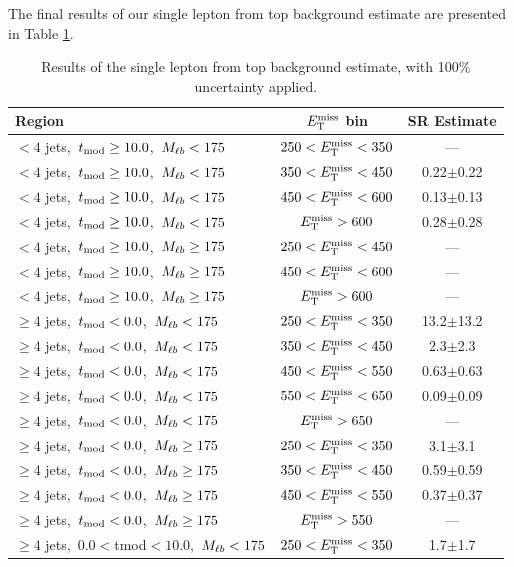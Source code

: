 The final results of our single lepton from top background estimate
are presented in Table \ref{tab:stop:1ltop:results}.

\begin{table}[htbp]
\centering
\caption{Results of the single lepton from top background estimate,
  with 100\% uncertainty applied.}
\label{tab:stop:1ltop:results}
\begin{tabular}{|l|c|c|}
\hline
Region & $E_\text{T}^\text{miss}$ bin & SR Estimate\\
\hline
$<4$ jets,~$t_\text{mod} \ge10.0$,~$M_{\ell b} <175$ & $250<E_\text{T}^\text{miss}<350$ &  ---  \\
$<4$ jets,~$t_\text{mod} \ge10.0$,~$M_{\ell b} <175$ & $350<E_\text{T}^\text{miss}<450$ &  0.22$\pm$0.22 \\
$<4$ jets,~$t_\text{mod} \ge10.0$,~$M_{\ell b} <175$ & $450<E_\text{T}^\text{miss}<600$ &  0.13$\pm$0.13  \\
$<4$ jets,~$t_\text{mod} \ge10.0$,~$M_{\ell b} <175$ & $E_\text{T}^\text{miss}>600$     &  0.28$\pm$0.28 \\
\hline
$<4$ jets,~$t_\text{mod} \ge10.0$,~$M_{\ell b} \ge175$ & $250<E_\text{T}^\text{miss}<450$ &  --- \\
$<4$ jets,~$t_\text{mod} \ge10.0$,~$M_{\ell b} \ge175$ & $450<E_\text{T}^\text{miss}<600$ &  ---  \\
$<4$ jets,~$t_\text{mod} \ge10.0$,~$M_{\ell b} \ge175$ & $E_\text{T}^\text{miss}>600$     &  ---  \\
\hline
$\ge4$ jets,~$t_\text{mod} <0.0$,~$M_{\ell b} <175$ & $250<E_\text{T}^\text{miss}<350$ &  13.2$\pm$13.2  \\
$\ge4$ jets,~$t_\text{mod} <0.0$,~$M_{\ell b} <175$ & $350<E_\text{T}^\text{miss}<450$ &  2.3$\pm$2.3  \\
$\ge4$ jets,~$t_\text{mod} <0.0$,~$M_{\ell b} <175$ & $450<E_\text{T}^\text{miss}<550$ &  0.63$\pm$0.63  \\
$\ge4$ jets,~$t_\text{mod} <0.0$,~$M_{\ell b} <175$ & $550<E_\text{T}^\text{miss}<650$ &  0.09$\pm$0.09 \\
$\ge4$ jets,~$t_\text{mod} <0.0$,~$M_{\ell b} <175$ & $E_\text{T}^\text{miss}>650$     &  --- \\
\hline
$\ge4$ jets,~$t_\text{mod} <0.0$,~$M_{\ell b} \ge175$ & $250<E_\text{T}^\text{miss}<350$ &  3.1$\pm$3.1  \\
$\ge4$ jets,~$t_\text{mod} <0.0$,~$M_{\ell b} \ge175$ & $350<E_\text{T}^\text{miss}<450$ &  0.59$\pm$0.59  \\
$\ge4$ jets,~$t_\text{mod} <0.0$,~$M_{\ell b} \ge175$ & $450<E_\text{T}^\text{miss}<550$ &  0.37$\pm$0.37  \\
$\ge4$ jets,~$t_\text{mod} <0.0$,~$M_{\ell b} \ge175$ & $E_\text{T}^\text{miss}>550$     &  ---  \\
\hline
$\ge4$ jets,~$0.0<$tmod$<10.0$,~$M_{\ell b} <175$ & $250<E_\text{T}^\text{miss}<350$ &  1.7$\pm$1.7  \\

\end{tabular}
\end{table}
